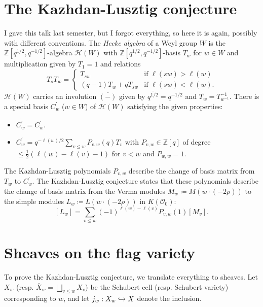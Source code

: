 \documentclass[leqno, openany]{memoir}
\theoremstyle{definition}
\theoremstyle{remark}
\theoremstyle{plain}
\theoremstyle{definition}
\theoremstyle{remark}
\begin{document}
\section{The Kazhdan-Lusztig conjecture}
I gave this talk last semester, but I forgot everything, so here it is again, possibly with different conventions. The \textit{Hecke algebra} of a Weyl group $W$ is the $\mathbb{Z}[q^{1/2},q^{-1/2}]$-algebra $\mathcal{H}(W)$ with $\mathbb{Z}[q^{1/2},q^{-1/2}]$-basis $T_w$ for $w \in W$ and multiplication given by $T_1 = 1$ and relations $$T_sT_w = \begin{cases}T_{sw} &\text{if }\ell(sw) > \ell(w) \\ (q - 1)T_w + qT_{sw} &\text{if }\ell(sw) < \ell(w).\end{cases}$$ $\mathcal{H}(W)$ carries an involution $\overline{(-)}$ given by $\overline{q^{1/2}} = q^{-1/2}$ and $\overline{T_w} = T_{w^{-1}}^{-1}$. There is a special basis $C_w^{\prime}$ ($w \in W$) of $\mathcal{H}(W)$ satisfying the given properties: \begin{itemize}
\item $\overline{C_w^{\prime}} = C_w^{\prime}$.

\item $C_w^{\prime} = q^{-\ell(w)/2}\sum_{v \le w}P_{v,w}(q)T_v$ with $P_{v,w} \in \mathbb{Z}[q]$ of degree $\le \frac{1}{2}(\ell(w) - \ell(v) - 1)$ for $v < w$ and $P_{w,w} = 1$.

\end{itemize}

The Kazhdan-Lusztig polynomials $P_{v,w}$ describe the change of basis matrix from $T_w$ to $C_w^{\prime}$. The Kazhdan-Lusztig conjecture states that these polynomials describe the change of basis matrix from the Verma modules $M_w \coloneqq M(w \cdot (-2\rho))$ to the simple modules $L_w \coloneqq L(w \cdot (-2\rho))$ in $K(\mathcal{O}_0)$: $$[L_w] = \sum_{v \le w}(-1)^{\ell(w) - \ell(v)}P_{v,w}(1)[M_v].$$

\section{Sheaves on the flag variety}
To prove the Kazhdan-Lusztig conjecture, we translate everything to sheaves. Let $X_w$ (resp. $\overline{X}_w = \bigsqcup_{v \le w}X_v$) be the Schubert cell (resp. Schubert variety) corresponding to $w$, and let $j_w: X_w \xhookrightarrow{} X$ denote the inclusion.
\end{document}
